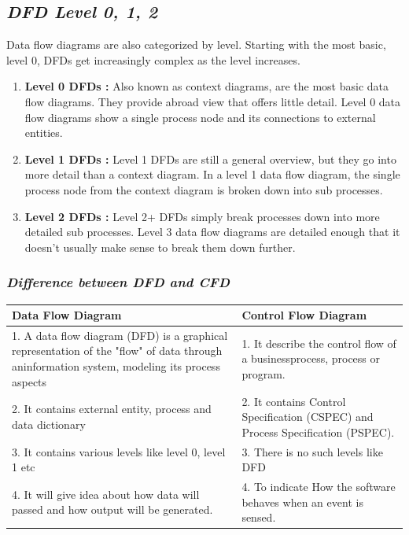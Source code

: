 \documentclass{article}
\begin{document}
\subsection{\textbf{\textit{DFD Level 0, 1, 2}}}
Data flow diagrams are also categorized by level. Starting with the most basic, level 0, DFDs get increasingly complex as the level increases.
\begin{enumerate}
	\item \textbf{Level 0 DFDs :} Also known as context diagrams, are the most basic data flow diagrams. They provide abroad view that offers little detail. Level 0 data flow diagrams show a single process node and its connections to external entities.
	\item \textbf{Level 1 DFDs :} Level 1 DFDs are still a general overview, but they go into more detail than a context diagram. In a level 1 data flow diagram, the single process node from the context diagram is broken down into sub processes.
	\item \textbf{Level 2 DFDs :} Level 2+ DFDs simply break processes down into more detailed sub processes. Level 3 data flow diagrams are detailed enough that it doesn’t usually make sense to break them down further.
\end{enumerate}
\subsubsection{\textit{Difference between DFD and CFD}}
\begin{tabular}{|p{3cm}|p{3cm}|}
	
		\hline
		\textbf{Data Flow Diagram} & \textbf{Control Flow Diagram} \\
		\hline
		1. A data flow diagram (DFD) is a graphical representation of the "flow" 
		of data through aninformation
		system, modeling its process aspects & 1. It describe the control flow
		of a businessprocess, process or program. \\
		\midrule
		2. It contains external entity, process and data dictionary & 2. It contains Control Specification (CSPEC) and Process Specification (PSPEC). \\
		\midrule
		3. It contains various levels like level 0, level 1 etc & 3. There is no such levels like DFD \\
		\midrule
		4. It will give idea about how data will passed and how output will be generated. & 4. To indicate How the software behaves when an event is sensed. \\
		\hline
\end{tabular}
\end{document}
